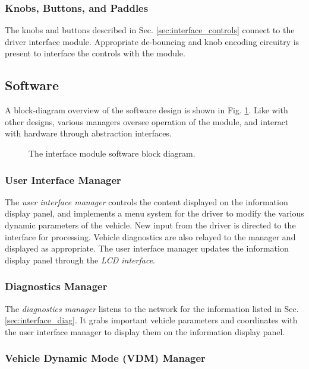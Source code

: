 \subsubsection{Knobs, Buttons, and Paddles}

The knobs and buttons described in Sec. \ref{sec:interface_controls} connect to the driver interface module. Appropriate de-bouncing and knob encoding circuitry is present to interface the controls with the module. 

\subsection{Software}

A block-diagram overview of the software design is shown in Fig. \ref{fig:interface_software_design_block}. Like with other designs, various managers oversee operation of the module, and interact with hardware through abstraction interfaces.

\begin{figure}[H]
	\centering
	
	\caption{The interface module software block diagram.}
	\label{fig:interface_software_design_block}
\end{figure}

\subsubsection{User Interface Manager}

The \emph{user interface manager} controls the content displayed on the information display panel, and implements a menu system for the driver to modify the various dynamic parameters of the vehicle. New input from the driver is directed to the interface for processing. Vehicle diagnostics are also relayed to the manager and displayed as appropriate. The user interface manager updates the information display panel through the \emph{LCD interface}.

\subsubsection{Diagnostics Manager}

The \emph{diagnostics manager} listens to the network for the information listed in Sec. \ref{sec:interface_diag}. It grabs important vehicle parameters and coordinates with the user interface manager to display them on the information display panel.

\subsubsection{Vehicle Dynamic Mode (VDM) Manager}

